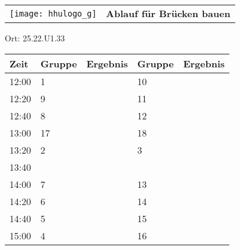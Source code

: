 \documentclass[a4paper,10pt]{article}
\def\spiela{Brücken bauen}
\def\rauma{25.22.U1.33}
\begin{document}
  \begin{tabularx}{\textwidth}{lc}
    \texttt{[image: hhulogo\_g]}
  & {\Huge \textbf{Ablauf für \spiela}}
  \end{tabularx}
  \LARGE
  \begin{center}
    \vspace{1cm} 
    Ort: \rauma
  \end{center}
    \vspace{2cm} 
    \begin{tabularx}{\textwidth}{X||X|X||X|X}
	\textbf{Zeit} &\textbf{Gruppe} & \textbf{Ergebnis} &\textbf{Gruppe} & \textbf{Ergebnis}  	\\ \hline \hline
	12:00 &1	&	&10	&	\\ \hline
	12:20 &	9	&	&11	&	\\ \hline
	12:40 &	8	&	&12	&	\\ \hline

	13:00 &	17	&	&18	&	\\ \hline
	13:20 &	2	&	&3	&	\\ \hline
	13:40 &		&	&	&	\\ \hline

	14:00 &	7	&	&13	&	\\ \hline
	14:20 &	6	&	&14	&	\\ \hline
	14:40 &	5	&	&15	&	\\ \hline

	15:00 &	4	&	&16	&	\\ \hline
      
    \end{tabularx}
   
   \newpage
\end{document}
